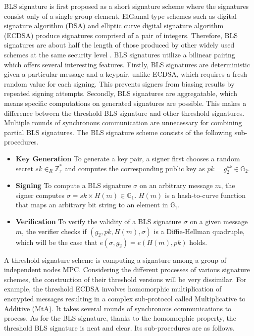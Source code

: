 \documentclass[11pt]{article}
\begin{document}
BLS signature is first proposed as a short signature scheme where the signatures consist only of a single group element. ElGamal type schemes such as digital signature algorithm (DSA) and elliptic curve digital signature algorithm (ECDSA) produce signatures comprised of a pair of integers. Therefore, BLS signatures are about half the length of those produced by other widely used schemes at the same security level \cite{menezes2009introduction}. BLS signatures utilize a bilinear pairing which offers several interesting features. Firstly, BLS signatures are deterministic given a particular message and a keypair, unlike ECDSA, which requires a fresh random value for each signing. This prevents signers from biasing results by repeated signing attempts. Secondly, BLS signatures are aggregatable, which means specific computations on generated signatures are possible. This makes a difference between the threshold BLS signature and other threshold signatures. Multiple rounds of synchronous communication are unnecessary for combining partial BLS signatures. The BLS signature scheme consists of the following sub-procedures.

\begin{itemize}
    \item[] \textbf{Key Generation} To generate a key pair, a signer first chooses a random secret $sk \in_R \mathbb{Z}_r^*$ and computes the corresponding public key as $pk = g_2^{sk} \in \mathbb{G}_2$.
    \item[] \textbf{Signing} To compute a BLS signature $\sigma$ on an arbitrary message $m$, the signer computes $\sigma = sk \times H(m) \in \mathbb{G}_1$. $H(m)$ is a hash-to-curve function that maps an arbitrary bit string to an element in $\mathbb{G}_1$.
    \item[] \textbf{Verification} To verify the validity of a BLS signature $\sigma$ on a given message $m$, the verifier checks if $(g_2,pk,H(m),\sigma)$ is a Diffie-Hellman quadruple, which will be the case that $e(\sigma,g_2)=e(H(m),pk)$ holds.
\end{itemize}

A threshold signature scheme is computing a signature among a group of independent nodes MPC. Considering the different processes of various signature schemes, the construction of their threshold versions will be very dissimilar. For example, the threshold ECDSA involves homomorphic multiplication of encrypted messages resulting in a complex sub-protocol called Multiplicative to Additive (MtA). It takes several rounds of synchronous communications to process. As for the BLS signature, thanks to the homomorphic property, the threshold BLS signature is neat and clear. Its sub-procedures are as follows.
\end{document}
